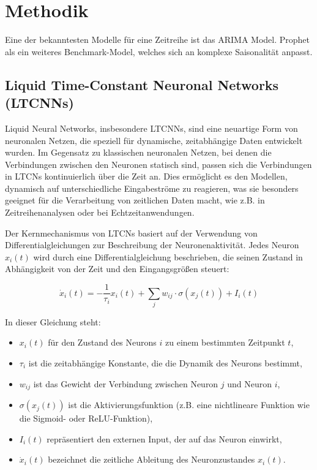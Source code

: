 \documentclass[11pt,ngerman,a4paper,]{article}
\providecommand{\tightlist}{%
  \setlength{\itemsep}{0pt}\setlength{\parskip}{0pt}}
\begin{document}
\section{Methodik}\label{methodik}

Eine der bekanntesten Modelle für eine Zeitreihe ist das ARIMA Model.
Prophet als ein weiteres Benchmark-Model, welches sich an komplexe Saisonalität
anpasst.

\subsection{Liquid Time-Constant Neuronal Networks (LTCNNs)}\label{liquid-time-constant-neuronal-networks-ltcnns}

Liquid Neural Networks, insbesondere LTCNNs, sind eine neuartige Form von neuronalen Netzen, die speziell für dynamische, zeitabhängige Daten entwickelt wurden. Im Gegensatz zu klassischen neuronalen Netzen, bei denen die Verbindungen zwischen den Neuronen statisch sind, passen sich die Verbindungen in LTCNs kontinuierlich über die Zeit an. Dies ermöglicht es den Modellen, dynamisch auf unterschiedliche Eingabeströme zu reagieren, was sie besonders geeignet für die Verarbeitung von zeitlichen Daten macht, wie z.B. in Zeitreihenanalysen oder bei Echtzeitanwendungen.

Der Kernmechanismus von LTCNs basiert auf der Verwendung von Differentialgleichungen zur Beschreibung der Neuronenaktivität. Jedes Neuron \(x_i(t)\) wird durch eine Differentialgleichung beschrieben, die seinen Zustand in Abhängigkeit von der Zeit und den Eingangsgrößen steuert:

\[
\dot{x}_i(t) = -\frac{1}{\tau_i} x_i(t) + \sum_j w_{ij} \cdot \sigma(x_j(t)) + I_i(t)
\]

In dieser Gleichung steht:

\begin{itemize}
\tightlist
\item
  \(x_i(t)\) für den Zustand des Neurons \(i\) zu einem bestimmten Zeitpunkt \(t\),
\item
  \(\tau_i\) ist die zeitabhängige Konstante, die die Dynamik des Neurons bestimmt,
\item
  \(w_{ij}\) ist das Gewicht der Verbindung zwischen Neuron \(j\) und Neuron \(i\),
\item
  \(\sigma(x_j(t))\) ist die Aktivierungsfunktion (z.B. eine nichtlineare Funktion wie die Sigmoid- oder ReLU-Funktion),
\item
  \(I_i(t)\) repräsentiert den externen Input, der auf das Neuron einwirkt,
\item
  \(\dot{x}_i(t)\) bezeichnet die zeitliche Ableitung des Neuronzustandes \(x_i(t)\).
\end{itemize}
\end{document}
